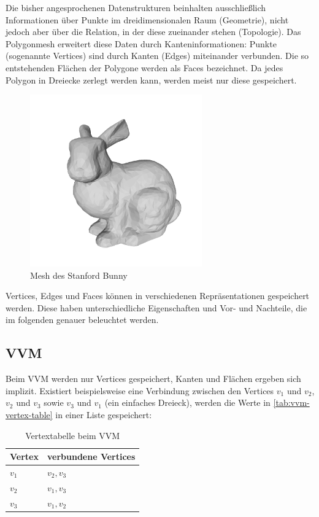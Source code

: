 Die bisher angesprochenen Datenstrukturen beinhalten ausschließlich Informationen über Punkte im dreidimensionalen Raum (Geometrie), nicht jedoch aber über die Relation, in der diese zueinander stehen (Topologie).
Das Polygonmesh erweitert diese Daten durch Kanteninformationen: Punkte (sogenannte Vertices) sind durch Kanten (Edges) miteinander verbunden.
Die so entstehenden Flächen der Polygone werden als Faces bezeichnet.
Da jedes Polygon in Dreiecke zerlegt werden kann, werden meist nur diese gespeichert.

\begin{figure}[ht]
	\centering
	\includegraphics[width=0.66\textwidth, frame]{images/bunny_mesh.png}
	\caption{Mesh des Stanford Bunny \cite{stanfordbunny}}
	\label{fig:bunny_mesh}
\end{figure}

Vertices, Edges und Faces können in verschiedenen Repräsentationen gespeichert werden.
Diese haben unterschiedliche Eigenschaften und Vor- und Nachteile, die im folgenden genauer beleuchtet werden.

\subsection{\acl{VVM}}
\label{subsec:v-v-mesh}

Beim \ac{VVM} werden nur Vertices gespeichert, Kanten und Flächen ergeben sich implizit.
Existiert beispielsweise eine Verbindung zwischen den Vertices $v_1$ und $v_2$, $v_2$ und $v_3$ sowie $v_3$ und $v_1$ (ein einfaches Dreieck), werden die Werte in \autoref{tab:vvm-vertex-table} in einer Liste gespeichert:

\begin{table}[ht]
\centering
\begin{tabular}{| l | l |}
	\hline
	Vertex & verbundene Vertices\\
	\hline
	$v_1$ & $v_2, v_3$\\
	$v_2$ & $v_1, v_3$\\
	$v_3$ & $v_1, v_2$\\
	\hline
\end{tabular}
\caption{Vertextabelle beim \ac{VVM}}
\label{tab:vvm-vertex-table}
\end{table}

